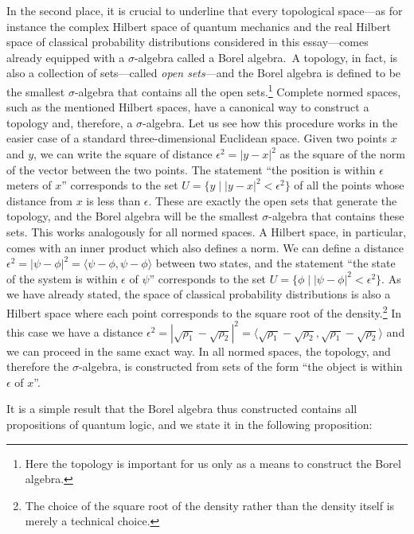 \documentclass[11pt, executivepaper]{article}
\begin{document}
In the second place, it is crucial to underline that every topological space---as for instance the complex Hilbert space of quantum mechanics and the real Hilbert space of classical probability distributions considered in this essay---comes already equipped with a $\sigma$-algebra called a Borel algebra.\ A topology, in fact, is also a collection of sets---called \emph{open sets}---and the Borel algebra is defined to be the smallest $\sigma$-algebra that contains all the open sets.\footnote{Here the topology is important for us only as a means to construct the Borel algebra.} Complete normed spaces, such as the mentioned Hilbert spaces, have a canonical way to construct a topology and, therefore, a $\sigma$-algebra. Let us see how this procedure works in the easier case of a standard three-dimensional Euclidean space. Given two points $x$ and $y$, we can write the square of distance $\epsilon^2 = |y - x|^2$ as the square of the norm of the vector between the two points. The statement ``the position is within $\epsilon$ meters of $x$'' corresponds to the set $U = \{y \; | \; |y - x|^2 < \epsilon^2 \}$ of all the points whose distance from $x$ is less than $\epsilon$. These are exactly the open sets that generate the topology, and the Borel algebra will be the smallest $\sigma$-algebra that contains these sets. This works analogously for all normed spaces. A Hilbert space, in particular, comes with an inner product which also defines a norm. We can define a distance $\epsilon^2 = |\psi - \phi|^2=\langle \psi - \phi , \psi - \phi \rangle$ between two states, and the statement ``the state of the system is within $\epsilon$ of $\psi$'' corresponds to the set $U = \{\phi \; | \; |\psi - \phi|^2 < \epsilon^2\}$. As we have already stated, the space of classical probability distributions is also a Hilbert space where each point corresponds to the square root of the density.\footnote{The choice of the square root of the density rather than the density itself is merely a technical choice.} In this case we have a distance $\epsilon^2 = |\sqrt{\rho_1} - \sqrt{\rho_2}|^2=\langle \sqrt{\rho_1} - \sqrt{\rho_2} , \sqrt{\rho_1} - \sqrt{\rho_2} \rangle$ and we can proceed in the same exact way. In all normed spaces, the topology, and therefore the $\sigma$-algebra, is constructed from sets of the form ``the object is within $\epsilon$ of $x$''.

It is a simple result that the Borel algebra thus constructed contains all propositions of quantum logic, and we state it in the following proposition:
\end{document}

